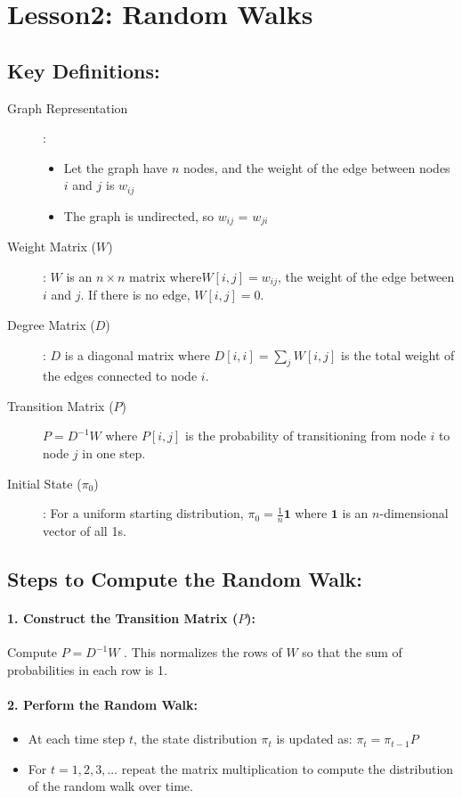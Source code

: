 \section{Lesson2: Random Walks}
\subsection{\textbf{Key Definitions}:}
\begin{description}
    \item [Graph Representation]:
    \begin{itemize}
        \item Let the graph have $n$ nodes, and the weight of the edge between nodes $i$ and $j$ is $w_{ij}$ 
        \item The graph is undirected, so $w_{ij}$ = $w_{ji}$ 
    \end{itemize}
    \item [Weight Matrix ($W$)]:
$W$ is an $n\times n$  matrix where$ W[i,j]=w_{ij}$, the weight of the edge between $i$ and $j$. If there is no edge, $W[i,j]=0$.
    \item [Degree Matrix ($D$)]:
$D$ is a diagonal matrix where $D[i, i]$$ = \sum\limits_{j} W[i, j]$ is the total weight of the edges connected to node $i$.
    \item [Transition Matrix ($P$)]  $P=D^{-1}W$ where $P[i,j]$ is the probability of transitioning from node $i$ to node $j$ in one step.
    \item [Initial State ($\pi_0$)]:
For a uniform starting distribution, $\pi_0=\frac{1}{n}\textbf{1}$ where $\textbf{1}$ is an $n$-dimensional vector of all 1s.
\end{description}

\subsection{Steps to Compute the Random Walk:}
\paragraph{1. \textbf{Construct the Transition Matrix ($P$)}:}
Compute $P=D^{-1}W$ . This normalizes the rows of $W$ so that the sum of probabilities in each row is 1.
\paragraph{2. \textbf{Perform the Random Walk}:}
\begin{itemize}
    \item At each time step $t$, the state distribution $\pi_t$ is updated as: $\pi_t=\pi_{t-1}P$ 
    \item For $t=1,2,3,\ldots$ repeat the matrix multiplication to compute the distribution of the random walk over time.
\end{itemize}

